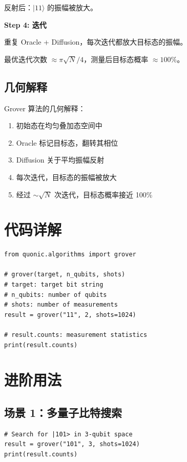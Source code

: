 \documentclass[12pt,a4paper]{article}
\begin{document}
反射后：$|11\rangle$ 的振幅被放大。

\textbf{Step 4: 迭代}

重复 Oracle + Diffusion，每次迭代都放大目标态的振幅。

最优迭代次数 $\approx \pi\sqrt{N}/4$，测量后目标态概率 $\approx 100\%$。

\subsection{几何解释}

Grover 算法的几何解释：
\begin{enumerate}
  \item 初始态在均匀叠加态空间中
  \item Oracle 标记目标态，翻转其相位
  \item Diffusion 关于平均振幅反射
  \item 每次迭代，目标态的振幅被放大
  \item 经过 $\sim\sqrt{N}$ 次迭代，目标态概率接近 100\%
\end{enumerate}

\section{代码详解}

\begin{lstlisting}[style=python]
from quonic.algorithms import grover

# grover(target, n_qubits, shots)
# target: target bit string
# n_qubits: number of qubits
# shots: number of measurements
result = grover("11", 2, shots=1024)

# result.counts: measurement statistics
print(result.counts)
\end{lstlisting}

\section{进阶用法}

\subsection{场景 1：多量子比特搜索}

\begin{lstlisting}[style=python]
# Search for |101> in 3-qubit space
result = grover("101", 3, shots=1024)
print(result.counts)
\end{lstlisting}
\end{document}
